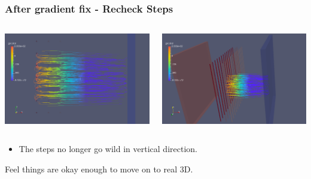\documentclass[xcolor=dvipsnames]{beamer}
\begin{document}
\begin{frame}
  \frametitle{After gradient fix - Recheck Steps}
  \begin{columns}
    \begin{column}{0.5\textwidth}
      \includegraphics[width=\textwidth]{twodee-fine-steps-plan-gradfixed.png}      
    \end{column}
    \begin{column}{0.5\textwidth}
      \includegraphics[width=\textwidth]{twodee-fine-steps-side-gradfixed.png}      
    \end{column}
  \end{columns}
  \footnotesize
  \begin{itemize}
  \item The steps no longer go wild in vertical direction.
  \end{itemize}

  \vfill

  Feel things are okay enough to move on to real 3D.
\end{frame}
\end{document}
